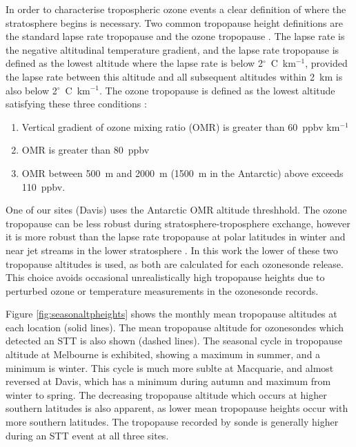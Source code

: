 \documentclass{article}
\begin{document}
    In order to characterise tropospheric ozone events a clear definition of where the stratosphere begins is necessary.
    Two common tropopause height definitions are the standard lapse rate tropopause \citep{WMO1957} and the ozone tropopause \citep{Bethan1996}.
    The lapse rate is the negative altitudinal temperature gradient, and the lapse rate tropopause is defined as the lowest altitude where the lapse rate is below 2$^\circ$~C~km$^{-1}$, provided the lapse rate between this altitude and all subsequent altitudes within 2~km is also below 2$^\circ$~C~km$^{-1}$.
    The ozone tropopause is defined as the lowest altitude satisfying these three conditions \citep{Bethan1996}:
    \begin{enumerate}
      \item Vertical gradient of ozone mixing ratio (OMR) is greater than 60~ppbv km$^{-1}$
      \item OMR is greater than 80~ppbv
      \item OMR between 500~m and 2000~m (1500~m in the Antarctic) above exceeds 110~ppbv.
    \end{enumerate}
    One of our sites (Davis) uses the Antarctic OMR altitude threshhold.
    The ozone tropopause can be less robust during stratosphere-troposphere exchange, however it is more robust than the lapse rate tropopause at polar latitudes in winter and near jet streams in the lower stratosphere \citep{Bethan1996, Tomikawa2009, Alexander2013}.
    In this work the lower of these two tropopause altitudes is used, as both are calculated for each ozonesonde release.
    This choice avoids occasional unrealistically high tropopause heights due to perturbed ozone or temperature measurements in the ozonesonde records.
    
    Figure \ref{fig:seasonaltpheights} shows the monthly mean tropopause altitudes at each location (solid lines).
    The mean tropopause altitude for ozonesondes which detected an STT is also shown (dashed lines). 
    The seasonal cycle in tropopause altitude at Melbourne is exhibited, showing a maximum in summer, and a minimum is winter.
    This cycle is much more sublte at Macquarie, and almost reversed at Davis, which has a minimum during autumn and maximum from winter to spring.
    The decreasing tropopause altitude which occurs at higher southern latitudes is also apparent, as lower mean tropopause heights occur with more southern latitudes.
    The tropopause recorded by sonde is generally higher during an STT event at all three sites.
\end{document}
